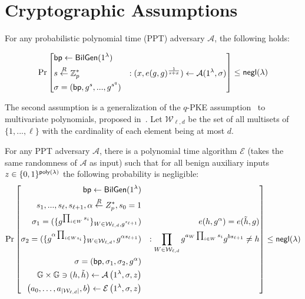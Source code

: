 \newpage

\appendix

\section{Cryptographic Assumptions}\label{app:assume}{}
\begin{assumption}
	\label{asp::qSDH}
	For any probabilistic polynomial time (PPT) adversary $\mathcal{A}$, the following holds:
	
	\[\Pr\left[ \begin{aligned}
	&\mathsf{bp} \leftarrow \mathsf{BilGen}(1^\lambda) & \\
	&s \overset{R}{\leftarrow} \mathbb{Z}^{*}_{p} & : (x, e(g, g)^{\frac{1}{s+x}}) \leftarrow \mathcal{A}(1^\lambda, \sigma)\\
	&\sigma = (\mathsf{bp}, g^s, ..., g^{s^q})
	\end{aligned} \right] \le {\sf negl}{(\lambda)}\]
\end{assumption}

The second assumption is a generalization of the $q$-PKE assumption~\cite{groth2010short} to multivariate polynomials, proposed in~\cite{zhang2017vsql,zkvpd}. Let $\mathcal {W}_ {\ell,d}$ be the set of all multisets of $\{1, . . . , \ell\}$ with the cardinality of each element being at most $d$. 

\begin{assumption}
	\label{asp::dlEPKE}
	For any PPT adversary $\mathcal{A}$, there is a polynomial time algorithm $\mathcal{E}$ (takes the same randomness of $\mathcal{A}$ as input) such that for all benign auxiliary inputs $z \in \{0,1\}^{{\sf poly}({\lambda})}$ the following probability is negligible:
	{\footnotesize
	\[\Pr\left[ \begin{aligned}
	\mathsf{bp} \leftarrow \mathsf{BilGen}(1^\lambda) && \\
	s_1, ..., s_\ell, s_{\ell + 1}, \alpha \overset{R}{\leftarrow} Z_{p}^*, s_0=1 && \\
	\sigma_1 = (\{g^{\prod_{i\in W}s_i}\}_{W\in \mathcal{W}_{\ell, d}, g^{s_{\ell+1}}}) &&\hspace*{10pt} e(h, g^\alpha)=e(\tilde{h}, g)\\
	\sigma_2 = (\{g^{\alpha\prod_{i\in Ws_i}}\}_{W\in \mathcal{W}_{\ell, d}}, g^{\alpha s_{\ell+1}}) && : \prod_{W\in \mathcal{W}_{\ell, d}}g^{a_{W}\prod_{i\in W}s_i}g^{b{s_{\ell+1}}}\neq h\\
	\sigma = (\mathsf{bp}, \sigma_1, \sigma_2, g^{\alpha}) && \\
	\mathbb{G} \times \mathbb{G} \ni (h, \tilde{h}) \leftarrow \mathcal{A} \left(1^{\lambda}, \sigma, z\right)&& \\
	\left( a _ { 0 } , \dots , a _ { \left| \mathcal { W } _ { \ell , d } \right| } , b \right) \leftarrow \mathcal { E } \left( 1 ^ { \lambda } , \sigma , z \right) &&
	\end{aligned}\right] \le {\sf negl}{(\lambda)}\]
	}
\end{assumption}

